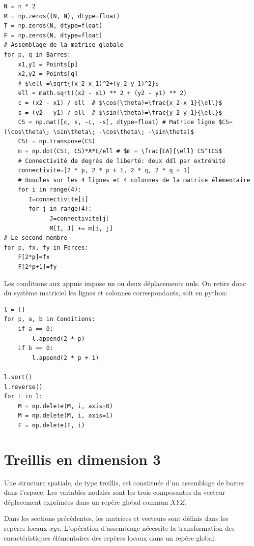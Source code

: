 \documentclass[a4paper]{article}
\begin{document}
\begin{verbatim}
N = n * 2
M = np.zeros((N, N), dtype=float)
T = np.zeros(N, dtype=float)
F = np.zeros(N, dtype=float) 
# Assemblage de la matrice globale
for p, q in Barres:
    x1,y1 = Points[p]
    x2,y2 = Points[q]
    # $\ell =\sqrt{(x_2-x_1)^2+(y_2-y_1)^2}$
    ell = math.sqrt((x2 - x1) ** 2 + (y2 - y1) ** 2)
    c = (x2 - x1) / ell  # $\cos(\theta)=\frac{x_2-x_1}{\ell}$
    s = (y2 - y1) / ell  # $\sin(\theta)=\frac{y_2-y_1}{\ell}$
    CS = np.mat([c, s, -c, -s], dtype=float) # Matrice ligne $CS=(\cos\theta\; \sin\theta\; -\cos\theta\; -\sin\theta)$
    CSt = np.transpose(CS)
    m = np.dot(CSt, CS)*A*E/ell # $m = \frac{EA}{\ell} CS^tCS$
    # Connectivité de degrés de liberté: deux ddl par extrémité
    connectivite=[2 * p, 2 * p + 1, 2 * q, 2 * q + 1]
    # Boucles sur les 4 lignes et 4 colonnes de la matrice élémentaire
    for i in range(4):
       I=connectivite[i]
       for j in range(4):
             J=connectivite[j]
             M[I, J] += m[i, j]
# Le second membre             
for p, fx, fy in Forces:
    F[2*p]=fx
    F[2*p+1]=fy         
\end{verbatim}
Les conditions aux appuis impose un ou deux déplacements nuls. On retire donc du système matriciel  les lignes et colonnes correspondants, soit en python:

\begin{verbatim}
l = []
for p, a, b in Conditions:
    if a == 0:
        l.append(2 * p)
    if b == 0:
        l.append(2 * p + 1)

l.sort()
l.reverse()
for i in l:
    M = np.delete(M, i, axis=0)
    M = np.delete(M, i, axis=1)
    F = np.delete(F, i)
\end{verbatim}

 
 
 \section{Treillis en dimension 3}
 Une structure spatiale, de type treillis, est constituée d'un assemblage de barres dans l'espace. Les variables nodales sont les trois composantes du vecteur déplacement exprimées dans un repère global commun $XYZ$.
 
 Dans les sections précédentes, les matrices et vecteurs sont définis dans les repères locaux $xyz$. L'opération d'assemblage nécessite la transformation des caractéristiques élémentaires des repères locaux dans un repère global.
 
\end{document}
